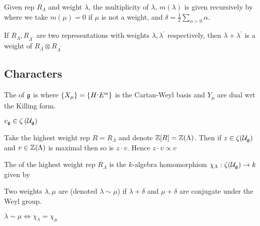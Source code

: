 \documentclass{article}
\begin{document}
\begin{theorem}
	Given rep $R_\Lambda$ and weight $\lambda$, the multiplicity of $\lambda, \, m(\lambda)$ is given recursively by 
where we take $m(\mu)=0$ if $\mu$ is not a weight, and $\delta = \frac{1}{2} \sum_{\alpha \succ 0} \alpha$. 
\end{theorem}

\begin{lemma}
	If $R_\Lambda, R_{\Lambda^\prime}$ are two representations with weights $\lambda,\lambda^\prime$ respectively, then $\lambda+\lambda^\prime$ is a weight of $R_\Lambda \otimes R_{\Lambda^\prime}$
\end{lemma}

\subsection{Characters}

\begin{definition}
	The  of $\mathfrak{g}$ is 
where $\left\{ X_\mu \right\} = \left\{ H^, E^\alpha \right\}$ is the Cartan-Weyl basis and $Y_\mu$ are dual wrt the Killing form. 
\end{definition}

\begin{lemma}
	$c_{\mathfrak{g}} \in \zeta \left( \mathcal{U}_{\mathfrak{g}} \right)$
\end{lemma}
\begin{lemma}
	Take the highest weight rep $R = R_\Lambda$ and denote $\mathbb{Z}[R] = \mathbb{Z}(\Lambda)$. Then if $z \in \zeta(\mathcal{U}_{\mathfrak{g}})$ and $v \in \mathbb{Z}(\Lambda)$ is maximal then so is $z \cdot v$. Hence $z \cdot v \propto v$
\end{lemma}

\begin{definition}
	The  of the highest weight rep $R_\Lambda$ is the $k$-algebra homomorphism $\chi_\Lambda : \zeta(\mathcal{U}_{\mathfrak{g}}) \to k$ given by 
\end{definition}

\begin{definition}
	Two weights $\lambda,\mu$ are  (denoted $\lambda \sim \mu$) if $\lambda+\delta$ and $\mu+\delta$ are conjugate under the Weyl group.  
\end{definition}

\begin{theorem}
	$\lambda \sim \mu \Leftrightarrow \chi_\lambda = \chi_\mu$
\end{theorem}


\end{document}
